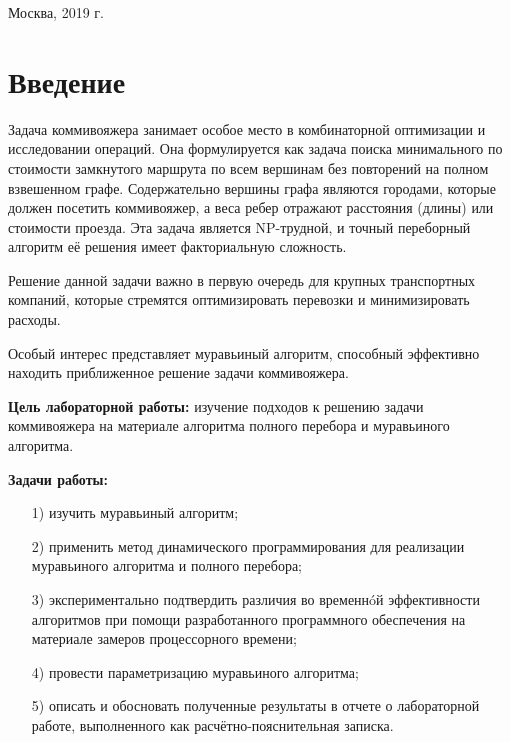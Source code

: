 \documentclass[a4paper,12pt]{article}
\begin{document}
\vspace*{40mm}
\begin{center}
	Москва, 2019 г.  
\end{center}
\thispagestyle{empty}

\tableofcontents

\section*{Введение}

Задача коммивояжера занимает особое место в комбинаторной оптимизации и 
исследовании операций. Она формулируется как задача поиска минимального по стоимости замкнутого 
маршрута по всем вершинам
без повторений на полном взвешенном графе. Содержательно вершины 
графа являются
городами, которые должен посетить коммивояжер, а веса ребер отражают расстояния 
(длины) или стоимости
проезда. Эта задача является NP-трудной, и точный переборный алгоритм её решения 
имеет факториальную
сложность. ~\cite{kom}

Решение данной задачи важно в первую очередь для крупных
транспортных компаний, которые стремятся оптимизировать перевозки
и минимизировать расходы. ~\cite{pract}

Особый интерес представляет муравьиный алгоритм,
способный эффективно находить приближенное решение задачи коммивояжера.

\textbf{Цель лабораторной работы:} изучение подходов к решению задачи коммивояжера
на материале алгоритма полного перебора и муравьиного алгоритма.

\textbf{Задачи работы:}

\begin{enumerate} 
	\item[1)] изучить муравьиный алгоритм;
	\item[2)] применить метод динамического программирования для  
	реализации муравьиного алгоритма и полного перебора;
	\item[3)] экспериментально подтвердить различия во временнóй эффективности алгоритмов 
	при помощи разработанного программного обеспечения на материале замеров процессорного 
	времени;
	\item[4)] провести параметризацию муравьиного алгоритма;
	\item[5)] описать и обосновать полученные результаты в отчете о лабораторной 
	работе, выполненного как расчётно-пояснительная записка. 
\end{enumerate} 
\pagebreak
\end{document}
